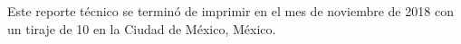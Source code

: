 %
%

\clearpage
\thispagestyle{plain}

\vspace*{\fill}
  Este reporte técnico se terminó de imprimir en el mes de noviembre de 2018
  con un tiraje de 10 en la Ciudad de México, México.
\vspace*{\fill}
